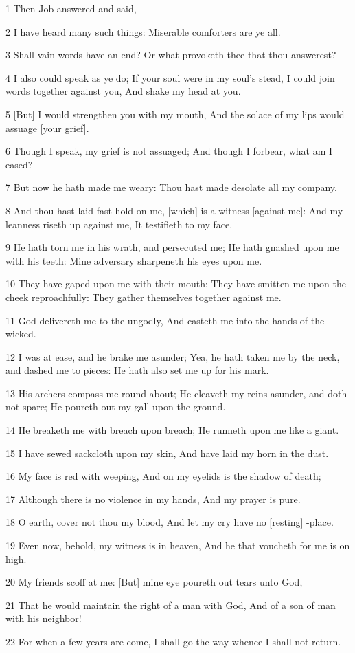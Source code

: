 \par 1 Then Job answered and said,
\par 2 I have heard many such things: Miserable comforters are ye all.
\par 3 Shall vain words have an end? Or what provoketh thee that thou answerest?
\par 4 I also could speak as ye do; If your soul were in my soul's stead, I could join words together against you, And shake my head at you.
\par 5 [But] I would strengthen you with my mouth, And the solace of my lips would assuage [your grief].
\par 6 Though I speak, my grief is not assuaged; And though I forbear, what am I eased?
\par 7 But now he hath made me weary: Thou hast made desolate all my company.
\par 8 And thou hast laid fast hold on me, [which] is a witness [against me]: And my leanness riseth up against me, It testifieth to my face.
\par 9 He hath torn me in his wrath, and persecuted me; He hath gnashed upon me with his teeth: Mine adversary sharpeneth his eyes upon me.
\par 10 They have gaped upon me with their mouth; They have smitten me upon the cheek reproachfully: They gather themselves together against me.
\par 11 God delivereth me to the ungodly, And casteth me into the hands of the wicked.
\par 12 I was at ease, and he brake me asunder; Yea, he hath taken me by the neck, and dashed me to pieces: He hath also set me up for his mark.
\par 13 His archers compass me round about; He cleaveth my reins asunder, and doth not spare; He poureth out my gall upon the ground.
\par 14 He breaketh me with breach upon breach; He runneth upon me like a giant.
\par 15 I have sewed sackcloth upon my skin, And have laid my horn in the dust.
\par 16 My face is red with weeping, And on my eyelids is the shadow of death;
\par 17 Although there is no violence in my hands, And my prayer is pure.
\par 18 O earth, cover not thou my blood, And let my cry have no [resting] -place.
\par 19 Even now, behold, my witness is in heaven, And he that voucheth for me is on high.
\par 20 My friends scoff at me: [But] mine eye poureth out tears unto God,
\par 21 That he would maintain the right of a man with God, And of a son of man with his neighbor!
\par 22 For when a few years are come, I shall go the way whence I shall not return.

